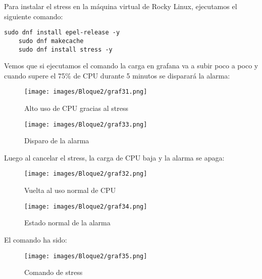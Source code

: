 \begin{enumerate}
    Para instalar el stress en la máquina virtual de Rocky Linux, ejecutamos el siguiente comando:
    \begin{lstlisting}[style=customstyle]
    sudo dnf install epel-release -y
    sudo dnf makecache
    sudo dnf install stress -y
    \end{lstlisting}

    Vemos que si ejecutamos el comando  la carga en grafana va a subir poco a poco y cuando supere el 75\% de CPU durante 5 minutos se disparará la alarma:
    \begin{figure}[H]
        \centering
        \begin{minipage}{0.45\textwidth}
            \centering
            \texttt{[image: images/Bloque2/graf31.png]}
            \caption{Alto uso de CPU gracias al stress}
            \label{fig:image1}
        \end{minipage}
        \hfill
        \begin{minipage}{0.45\textwidth}
            \centering
            \texttt{[image: images/Bloque2/graf33.png]}
            \caption{Disparo de la alarma}
            \label{fig:image2}
        \end{minipage}
    \end{figure}

    Luego al cancelar el stress, la carga de CPU baja y la alarma se apaga:
    \begin{figure}[H]
        \centering
        \begin{minipage}{0.45\textwidth}
            \centering
            \texttt{[image: images/Bloque2/graf32.png]}
            \caption{Vuelta al uso normal de CPU}
            \label{fig:image1}
        \end{minipage}
        \hfill
        \begin{minipage}{0.45\textwidth}
            \centering
            \texttt{[image: images/Bloque2/graf34.png]}
            \caption{Estado normal de la alarma}
            \label{fig:image2}
        \end{minipage}
    \end{figure}
    
    El comando ha sido:
    \begin{figure}[H]
        \centering
        \texttt{[image: images/Bloque2/graf35.png]}
        \caption{Comando de stress}
        \label{fig:comando_stress}
    \end{figure}
\end{enumerate}

